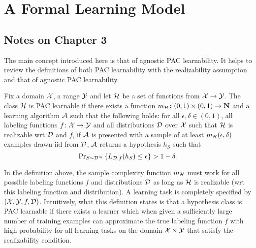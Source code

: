 \chapter{A Formal Learning Model}

\section*{Notes on Chapter 3}

The main concept introduced here is that of agnostic PAC learnability. It helps to 
review the definitions of both PAC learnability with the realizability assumption
and that of agnostic PAC learnability.

\begin{definition}
Fix a domain $\mathcal{X}$, a range $\mathcal{Y}$ and let $\mathcal{H}$ be a set of functions
from $\mathcal{X} \rightarrow \mathcal{Y}$. The class $\mathcal{H}$ is PAC learnable if there
exists a function $m_{\mathcal{H}} \colon (0, 1) \times (0, 1) \rightarrow \mathbf{N}$
and a learning algorithm $\mathcal{A}$ such that the following holds: for all
$\epsilon, \delta \in (0, 1)$, all labeling functions $f \colon \mathcal{X}
\rightarrow \mathcal{Y}$ and all distributions $\mathcal{D}$ over $\mathcal{X}$ such that
$\mathcal{H}$ is realizable wrt $\mathcal{D}$ and $f$, if $\mathcal{A}$ is presented with a
sample of at least $m_{\mathcal{H}}(\epsilon, \delta)$ examples drawn iid from
$\mathcal{D}$, $\mathcal{A}$ returns a hypothesis $h_S$ such that
\[
     \text{Pr}_{S \sim \mathcal{D}^m} \left \{ L_{\mathcal{D}, f} (h_S) \leq \epsilon \right \} 
        > 1 - \delta.
\]
\end{definition}

In the definition above, the sample complexity function $m_{\mathcal{H}}$ must work
for all possible labeling functions $f$ and distributions $\mathcal{D}$ as long as
$\mathcal{H}$ is realizable (wrt this labeling function and distribution). A
learning task is completely specified by $(\mathcal{X}, \mathcal{Y}, f, \mathcal{D})$.
Intuitively, what this definition states is that a hypothesis class is PAC
learnable if there exists a learner which when given a sufficiently large
number of training examples can approximate the true labeling function $f$ with
high probability for all learning tasks on the domain $\mathcal{X} \times \mathcal{Y}$ that
satisfy the realizability condition. 

